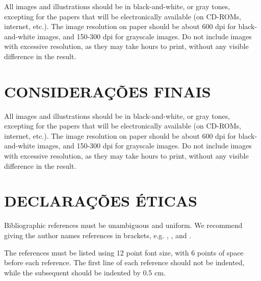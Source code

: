 \documentclass[12pt]{article}
\begin{document}
All images and illustrations should be in black-and-white, or gray tones,
excepting for the papers that will be electronically available (on CD-ROMs,
internet, etc.). The image resolution on paper should be about 600 dpi for
black-and-white images, and 150-300 dpi for grayscale images.  Do not include
images with excessive resolution, as they may take hours to print, without any
visible difference in the result. 

\section{CONSIDERAÇÕES FINAIS}

All images and illustrations should be in black-and-white, or gray tones,
excepting for the papers that will be electronically available (on CD-ROMs,
internet, etc.). The image resolution on paper should be about 600 dpi for
black-and-white images, and 150-300 dpi for grayscale images.  Do not include
images with excessive resolution, as they may take hours to print, without any
visible difference in the result. 

\section{DECLARAÇÕES ÉTICAS}

Bibliographic references must be unambiguous and uniform.  We recommend giving
the author names references in brackets, e.g. \cite{knuth:84},
\cite{boulic:91}, and \cite{smith:99}.

The references must be listed using 12 point font size, with 6 points of space
before each reference. The first line of each reference should not be
indented, while the subsequent should be indented by 0.5 cm.



\end{document}
